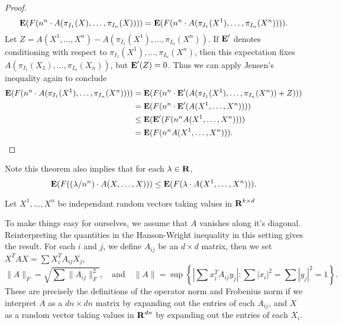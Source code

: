 \begin{proof}
	\[ \operatorname{\mathbf{E}}(F(n^n \cdot A(\pi_{I_1}(X),\dots,\pi_{I_n}(X)))) = \operatorname{\mathbf{E}}(F(n^n \cdot A(\pi_{I_1}(X^1),\dots,\pi_{I_n}(X^n)))). \]
	Let $Z = A(X^1,\dots,X^n) - A(\pi_{I_1}(X^1),\dots,\pi_{I_n}(X^n))$. If $\operatorname{\mathbf{E}}'$ denotes conditioning with respect to $\pi_{I_1}(X^1), \dots, \pi_{I_n}(X^n)$, then this expectation fixes $A(\pi_{I_1}(X_1),\dots,\pi_{I_n}(X_n))$, but $\operatorname{\mathbf{E}}'(Z) = 0$. Thus we can apply Jensen's inequality again to conclude
	\begin{align*}
		\operatorname{\mathbf{E}}(F(n^n \cdot A(\pi_{I_1}(X^1),\dots,\pi_{I_n}(X^n)))) &= \operatorname{\mathbf{E}}(F(n^n \cdot \operatorname{\mathbf{E}}'(A(\pi_{I_1}(X^1), \dots, \pi_{I_n}(X^n)) + Z)))\\
		&= \operatorname{\mathbf{E}}(F(n^n \cdot \operatorname{\mathbf{E}}'(A(X^1,\dots,X^n))))\\
		&\leq \operatorname{\mathbf{E}}(\operatorname{\mathbf{E}}'(F(n^n A(X^1,\dots,X^n))))\\
		&= \operatorname{\mathbf{E}}(F(n^n A(X^1,\dots,X^n))). \qedhere
	\end{align*}
\end{proof}

\begin{remark}
	Note this theorem also implies that for each $\lambda \in \operatorname{\mathbf{R}}$,
	\[ \operatorname{\mathbf{E}}(F((\lambda/n^n) \cdot A(X,\dots,X))) \leq \operatorname{\mathbf{E}}(F(\lambda \cdot A(X^1,\dots,X^n))). \]
\end{remark}

\begin{lemma}[Comparison]
	Let $X^1,\dots,X^n$ be independant random vectors taking values in $\operatorname{\mathbf{R}}^{k \times d}$
\end{lemma}

To make things easy for ourselves, we assume that $A$ vanishes along it's diagonal. Reinterpreting the quantities in the Hanson-Wright inequality in this setting gives the result. For each $i$ and $j$, we define $A_{ij}$ be an $d \times d$ matrix, then we set $X^T A X = \sum X_i^T A_{ij} X_j$,
%
\[ \| A \|_F = \sqrt{\sum \| A_{ij} \|_F^2}, \quad\text{and}\quad \| A \| = \sup \left\{ |\sum x_i^T A_{ij} y_j| : \sum |x_i|^2 = \sum |y_j|^2 = 1 \right\}. \]
%
These are precisely the definitions of the operator norm and Frobenius norm if we interpret $A$ as a $dn \times dn$ matrix by expanding out the entries of each $A_{ij}$, and $X$ as a random vector taking values in $\operatorname{\mathbf{R}}^{dn}$ by expanding out the entries of each $X_i$.

\endinput